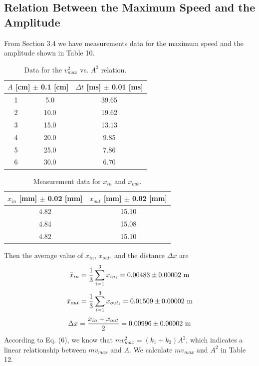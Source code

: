 \documentclass[a4paper]{report}
\begin{document}
	\subsection{Relation Between the Maximum Speed and the Amplitude}
	From Section 3.4 we have measurements data for the maximum speed and the amplitude shown in Table 10.
	\begin{table}[H]
		\centering
		\begin{tabular}{|c|c|c|}
			\hline
			\multicolumn{2}{|c|}{$A$ [cm] $\pm$ 0.1 [cm]}&$\Delta t$ [ms] $\pm$ 0.01 [ms]\\
			\hline
			1&5.0&39.65\\
			\hline
			2&10.0&19.62\\
			\hline
			3&15.0&13.13\\
			\hline
			4&20.0&9.85\\
			\hline
			5&25.0&7.86\\
			\hline
			6&30.0&6.70\\
			\hline
		\end{tabular}
	\caption{Data for the $v_{max}^2$ vs. $A^2$ relation.}
	\end{table}
	\begin{table}[H]
		\centering
		\begin{tabular}{|c|c|}
			\hline
			$x_{in}$ [mm] $\pm$ 0.02 [mm]&$x_{out}$ [mm] $\pm$ 0.02 [mm]\\
			\hline
			4.82&15.10\\
			\hline
			4.84&15.08\\
			\hline
			4.82&15.10\\
			\hline
		\end{tabular}
	\caption{Measurement data for $x_{in}$ and $x_{out}$.}
	\end{table}
	Then the average value of $x_{in}$, $x_{out}$, and the distance $\Delta x$ are
	\begin{equation*}
	{\bar{x}}_{in}=\dfrac{1}{3}\sum_{i=1}^3x_{in_i}=0.00483\pm 0.00002\ \rm{m}
	\end{equation*}
	\begin{equation*}
	{\bar{x}}_{out}=\dfrac{1}{3}\sum_{i=1}^3x_{out_i}=0.01509\pm 0.00002\ \rm{m}
	\end{equation*}
	\begin{equation*}
	\Delta x=\dfrac{x_{in}+x_{out}}{2}=0.00996\pm0.00002\ \rm{m}
	\end{equation*}
	According to Eq. (6), we know that $mv_{max}^2=(k_1+k_2)A^2$, which indicates a linear relationship between $mv_{max}$ and $A$. We calculate $mv_{max}$ and $A^2$ in Table 12.
\end{document}
